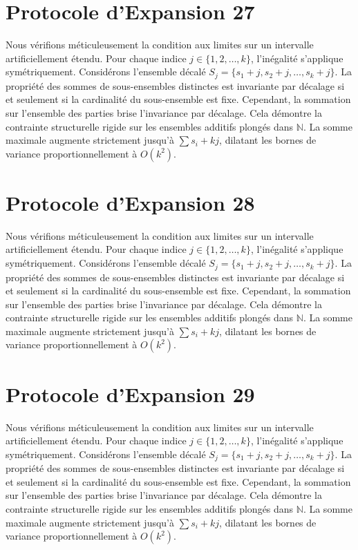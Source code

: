 \documentclass[12pt, a4paper, french]{article}
\theoremstyle{definition}
\begin{document}
\section{Protocole d'Expansion 27}
Nous vérifions méticuleusement la condition aux limites sur un intervalle artificiellement étendu. Pour chaque indice $j \in \{1, 2, \dots, k\}$, l'inégalité s'applique symétriquement. Considérons l'ensemble décalé $S_j = \{s_1 + j, s_2 + j, \dots, s_k + j\}$. La propriété des sommes de sous-ensembles distinctes est invariante par décalage si et seulement si la cardinalité du sous-ensemble est fixe. Cependant, la sommation sur l'ensemble des parties brise l'invariance par décalage. Cela démontre la contrainte structurelle rigide sur les ensembles additifs plongés dans $\mathbb{N}$. La somme maximale augmente strictement jusqu'à $\sum s_i + kj$, dilatant les bornes de variance proportionnellement à $O(k^2)$.

\section{Protocole d'Expansion 28}
Nous vérifions méticuleusement la condition aux limites sur un intervalle artificiellement étendu. Pour chaque indice $j \in \{1, 2, \dots, k\}$, l'inégalité s'applique symétriquement. Considérons l'ensemble décalé $S_j = \{s_1 + j, s_2 + j, \dots, s_k + j\}$. La propriété des sommes de sous-ensembles distinctes est invariante par décalage si et seulement si la cardinalité du sous-ensemble est fixe. Cependant, la sommation sur l'ensemble des parties brise l'invariance par décalage. Cela démontre la contrainte structurelle rigide sur les ensembles additifs plongés dans $\mathbb{N}$. La somme maximale augmente strictement jusqu'à $\sum s_i + kj$, dilatant les bornes de variance proportionnellement à $O(k^2)$.

\section{Protocole d'Expansion 29}
Nous vérifions méticuleusement la condition aux limites sur un intervalle artificiellement étendu. Pour chaque indice $j \in \{1, 2, \dots, k\}$, l'inégalité s'applique symétriquement. Considérons l'ensemble décalé $S_j = \{s_1 + j, s_2 + j, \dots, s_k + j\}$. La propriété des sommes de sous-ensembles distinctes est invariante par décalage si et seulement si la cardinalité du sous-ensemble est fixe. Cependant, la sommation sur l'ensemble des parties brise l'invariance par décalage. Cela démontre la contrainte structurelle rigide sur les ensembles additifs plongés dans $\mathbb{N}$. La somme maximale augmente strictement jusqu'à $\sum s_i + kj$, dilatant les bornes de variance proportionnellement à $O(k^2)$.
\end{document}
